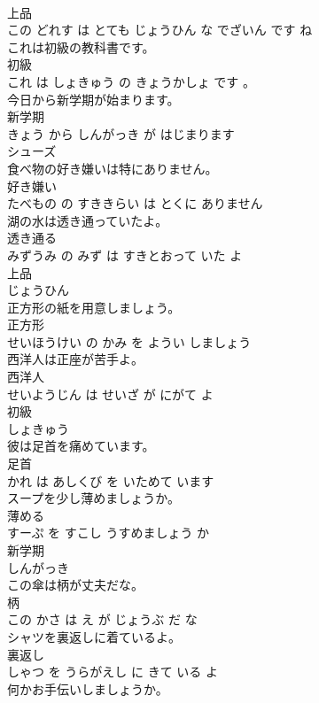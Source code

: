 \documentclass[8pt]{extreport}
\begin{document}
\begin{CJK}{UTF8}{min}
\\	上品 
\\	この どれす は とても じょうひん な でざいん です ね			
\\	これは初級の教科書です。	
\\	初級 
\\	これ は しょきゅう の きょうかしょ です 。			
\\	今日から新学期が始まります。	
\\	新学期 
\\	きょう から しんがっき が はじまります			
\\	シューズ	
\\	食べ物の好き嫌いは特にありません。	
\\	好き嫌い 
\\	たべもの の すききらい は とくに ありません			
\\	湖の水は透き通っていたよ。	
\\	透き通る 
\\	みずうみ の みず は すきとおって いた よ			
\\	上品	
\\	じょうひん		
\\	正方形の紙を用意しましょう。	
\\	正方形 
\\	せいほうけい の かみ を ようい しましょう			
\\	西洋人は正座が苦手よ。	
\\	西洋人 
\\	せいようじん は せいざ が にがて よ			
\\	初級	
\\	しょきゅう		
\\	彼は足首を痛めています。	
\\	足首 
\\	かれ は あしくび を いためて います			
\\	スープを少し薄めましょうか。	
\\	薄める 
\\	すーぷ を すこし うすめましょう か			
\\	新学期	
\\	しんがっき		
\\	この傘は柄が丈夫だな。	
\\	柄 
\\	この かさ は え が じょうぶ だ な			
\\	シャツを裏返しに着ているよ。	
\\	裏返し 
\\	しゃつ を うらがえし に きて いる よ			
\\	何かお手伝いしましょうか。	

\end{CJK}
\end{document}
